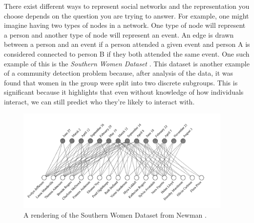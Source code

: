 There exist different ways to represent social networks and the representation you choose depends on the question you are trying to answer. For example, one might imagine having two types of nodes in a network. One type of node will represent a person and another type of node will represent an event. An edge is drawn between a person and an event if a person attended a given event and person A is considered connected to person B if they both attended the same event. One such example of this is the \emph{Southern Women Dataset} \cite{konect:southernwomen}. This dataset is another example of a community detection problem because, after analysis of the data, it was found that women in the group were split into two discrete subgroups. This is significant because it highlights that even without knowledge of how individuals interact, we can still predict who they're likely to interact with.

\begin{figure}
    \begin{center}
        \includegraphics[width=0.95\textwidth]{img/southern_women}
    \end{center}
    \caption{A rendering of the Southern Women Dataset from Newman  \cite[39]{newman10}.}
    \label{fig:southernwomen}
\end{figure}

